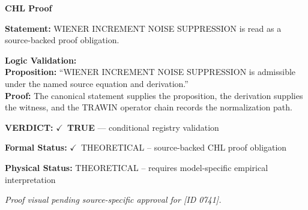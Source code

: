\vspace{0.45em}
\noindent\textbf{CHL Proof}\par
\textbf{Statement:} WIENER INCREMENT NOISE SUPPRESSION is read as a source-backed proof obligation.

\textbf{Logic Validation:}\\
\textbf{Proposition:} ``WIENER INCREMENT NOISE SUPPRESSION is admissible under the named source equation and derivation.''\\
\textbf{Proof:} The canonical statement supplies the proposition, the derivation supplies the witness, and the TRAWIN operator chain records the normalization path.

\textbf{VERDICT:} \ensuremath{\checkmark}\ \textbf{TRUE} --- conditional registry validation

\textbf{Formal Status:} \ensuremath{\checkmark}\ THEORETICAL -- source-backed CHL proof obligation

\textbf{Physical Status:} THEORETICAL -- requires model-specific empirical interpretation
\par\vspace{0.45em}
\par
\vfill
\begingroup\footnotesize\itshape
Proof visual pending source-specific approval for [ID 0741].
\par\endgroup
\vfill
\endgroup
\endgroup
